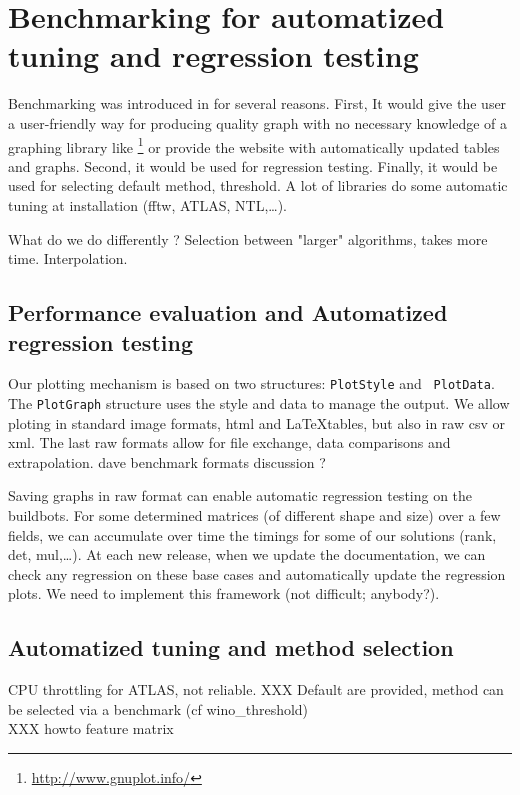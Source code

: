 \section{Benchmarking  for automatized tuning and regression testing}\label{sec:bench}
%
Benchmarking was introduced in \linbox for several reasons. First, It would
give the user a user-friendly way for producing quality graph with no necessary
knowledge of a graphing library like \gnuplot%
%
%
\footnote{\url{http://www.gnuplot.info/}}
%
or provide the \linbox website with automatically updated tables and graphs.
Second, it would be used for regression testing.  Finally, it would be used for
selecting default method, threshold. A lot of libraries do some automatic tuning
at installation (fftw, ATLAS, NTL,\ldots).
%
\par
%
What do we do differently ? Selection between "larger" algorithms, takes more time.
Interpolation.
%
%
\subsection{Performance evaluation and Automatized regression testing}
%
Our plotting mechanism is based on two structures: {\tt PlotStyle} and {\tt
PlotData}. The  {\tt PlotGraph} structure uses the style and data to manage the
output.  We allow ploting in standard image formats, html and \LaTeX tables,
but also in raw csv or xml. The last raw formats allow for file exchange, data
comparisons and extrapolation.
\danger dave benchmark formats discussion ?
%
\par
%
% 
%
%
Saving graphs in raw format can enable automatic regression testing on the
buildbots. For some determined matrices (of different shape and size) over a
few fields, we can accumulate over time the timings for some of our solutions
(rank, det, mul,\ldots). At each new release, when we update the documentation,
we can check any regression on these base cases and automatically update the
regression plots.
\danger We need to implement this framework (not difficult; anybody?).
%
\subsection{Automatized tuning and method selection}
%
CPU throttling for ATLAS, \fflasffpack not reliable.
XXX Default are provided, method can be selected via a benchmark (cf wino\_threshold)\\
XXX howto
feature matrix
